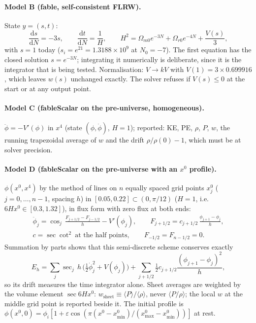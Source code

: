 \documentclass[11pt,a4paper]{article}
\newcommand{\fableScalar}{\textsf{fableScalar}}
\newcommand{\fable}{\textsf{fable}}
\newcommand{\dd}{\mathrm{d}}
\begin{document}
\paragraph{Model B (\fable, self-consistent FLRW).} State $y=(s,t)$:
\begin{equation}\label{eq:modelB}
  \frac{\dd s}{\dd N}=-3s,\qquad \frac{\dd t}{\dd N}=\frac1H,\qquad
  H^2=\Omega_{m0}e^{-3N}+\Omega_{r0}e^{-4N}+\frac{V(s)}{3},
\end{equation}
with $s=1$ today ($s_i=e^{21}=1.3188\times10^{9}$ at $N_0=-7$). The first equation has the
closed solution $s=e^{-3N}$; integrating it numerically is deliberate, since it is the integrator
that is being tested. Normalisation: $V\to kV$ with $V(1)=3\times0.699916$, which leaves
$w(s)$ unchanged exactly. The solver refuses if $V(s)\le0$ at the start or at any output point.

\paragraph{Model C (\fableScalar{} on the pre-universe, homogeneous).} $\ddot\phi=-V'(\phi)$ in
$x^4$ (state $(\phi,\dot\phi)$, $H=1$); reported: KE, PE, $\rho$, $P$, $w$, the running
trapezoidal average of $w$ and the drift $\rho/\rho(0)-1$, which must be at solver precision.

\paragraph{Model D (\fableScalar{} on the pre-universe with an $x^0$ profile).} $\phi(x^0,x^4)$
by the method of lines on $n$ equally spaced grid points $x^0_j$ ($j=0,\dots,n-1$, spacing $h$)
in $[0.05,0.22]\subset(0,\pi/12)$ ($H=1$, i.e.\ $6Hx^0\in[0.3,1.32]$), in flux form with zero
flux at both ends:
\begin{equation}\label{eq:modelD}
\begin{gathered}
  \ddot\phi_j=\cos_j\,\frac{F_{j+1/2}-F_{j-1/2}}{h}-V'(\phi_j),\qquad
  F_{j+1/2}=c_{j+1/2}\,\frac{\phi_{j+1}-\phi_j}{h},\\
  c=\sec\cot^2\ \text{at the half points},\qquad F_{-1/2}=F_{n-1/2}=0 .
\end{gathered}
\end{equation}
Summation by parts shows that this semi-discrete scheme conserves exactly
\begin{equation}\label{eq:Eh}
  E_h=\sum_j\sec_j\,h\,\bigl(\tfrac12\dot\phi_j^2+V(\phi_j)\bigr)+\sum_{j+1/2}\tfrac12c_{j+1/2}\frac{(\phi_{j+1}-\phi_j)^2}{h},
\end{equation}
so its drift measures the time integrator alone. Sheet averages are weighted by the volume
element $\sec 6Hx^0$: $w_{\mathrm{sheet}}\equiv\langle P\rangle/\langle\rho\rangle$, never
$\langle P/\rho\rangle$; the local $w$ at the middle grid point is reported beside it. The initial
profile is $\phi(x^0,0)=\phi_i[1+\varepsilon\cos(\pi(x^0-x^0_{\min})/(x^0_{\max}-x^0_{\min}))]$ at
rest.
\end{document}
